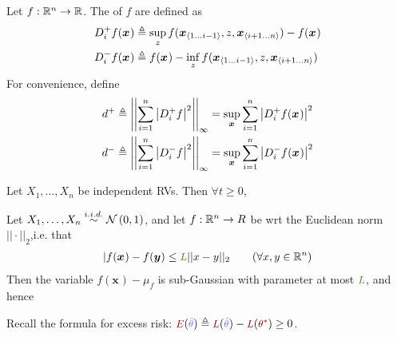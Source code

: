 \documentclass[11pt]{article}
\renewcommand\vec[2][]{\bm{#2}_{#1}}
\begin{document}
\begin{definition}
	Let $f : \mathbb{R}^n \to \mathbb{R}$. The  of $f$ are defined as
	\begin{align}
			D_i^+ f(\vec x)
		&\triangleq \sup_z f(\slice[i-1]{x}, z, \slice[n][i+1]{x}) - f(\vec x) \\
		D_i^- f(\vec x) 
			&\triangleq f(\vec x) - \inf_z f(\slice[i-1]{x}, z, \slice[n][i+1]{x}) 
	\end{align}
	For convenience, define 
	\begin{align}
		d^+ 
		&\triangleq \left|\left|  \insum \left| D_i^+ f  \right|^2  \right|\right|_{\infty} 
		= \sup_{\vec x} \insum \left| D_i^+ f(\vec x) \right|^2 \\
		d^- 
			&\triangleq \left|\left|  \insum \left| D_i^- f  \right|^2  \right|\right|_{\infty} 
			= \sup_{\vec x} \insum \left| D_i^- f(\vec x) \right|^2
	\end{align}
	
	Let $X_1, \ldots, X_n$ be independent RVs. Then $\forall t \geq 0$,
\end{definition}

\begin{definition}
	Let $X_1, \ldots, X_n \overset{i.i.d.}{\sim} \mathcal{N}\left( 0, 1 \right)$, and let $f: \mathbb{R}^n \to R$ be  wrt the Euclidean norm $||\cdot||_2$,i.e. that
	\begin{align}
		|f(\vec x) - f(\vec y) \leq \mgreen{L} ||x - y||_2 \qquad (\forall x, y \in \R^n)
	\end{align}
	Then the variable $f(\vec x) - \mu_f$ is sub-Gaussian with parameter at most $\mgreen{L}$, and hence 
	\graybox{
		\Prob{ |f(\vec x) - \mu_f | \geq t }
			&~\leq~ 2 \exp\lr{  - \frac{t^2}{2\mgreen{L}^2} }
	}
\end{definition}








Recall the formula for excess risk: $\mred{E}(\mblue{\hat \theta}) \triangleq \mred{L}(\mblue{\hat \theta}) - \mred{L}(\mred{\theta^*}) \geq 0$. 
\end{document}
